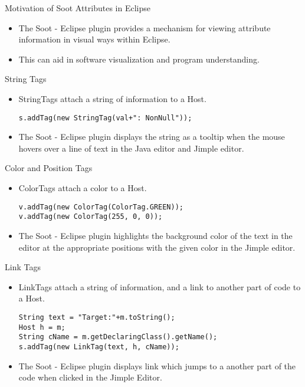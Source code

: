 \begin{slide}{Motivation of Soot Attributes in Eclipse}
\begin{itemize}
\item The Soot - Eclipse plugin provides a mechanism for viewing
attribute information in visual ways within Eclipse.
\item This can aid in software visualization and program understanding.
\end{itemize}
\end{slide}

\begin{slide}{String Tags}
\begin{itemize}
\item {\red StringTag}s attach a string of information to a {\red Host}.
{\scriptsize
\begin{verbatim}
s.addTag(new StringTag(val+": NonNull"));
\end{verbatim}
}
\item The Soot - Eclipse plugin displays the string as a tooltip when the mouse hovers over a line of text in the Java editor and Jimple editor.
\end{itemize}
\end{slide}

\begin{slide}{Color and Position Tags}
\begin{itemize}
\item {\red ColorTag}s attach a color to a {\red Host}.
{\scriptsize
\begin{verbatim}
v.addTag(new ColorTag(ColorTag.GREEN));
v.addTag(new ColorTag(255, 0, 0));
\end{verbatim}
}
\item The Soot - Eclipse plugin highlights the background color of the text in the editor at the appropriate positions with the given color in the Jimple editor.
\end{itemize}
\end{slide}

\begin{slide}{Link Tags}
\begin{itemize}
\item {\red LinkTag}s attach a string of information, and a link to another part of code to a {\red Host}.
{\scriptsize
\begin{verbatim}
String text = "Target:"+m.toString();
Host h = m;
String cName = m.getDeclaringClass().getName();
s.addTag(new LinkTag(text, h, cName));
\end{verbatim}
}
\item The Soot - Eclipse plugin displays link which jumps to a another part of the code when clicked in the Jimple Editor.
\end{itemize}
\end{slide}

